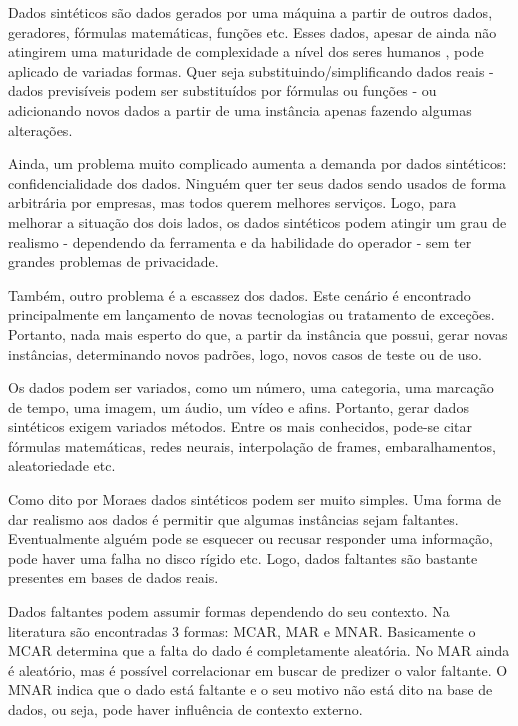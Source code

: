 \documentclass[
	12pt,				%
	openright,			%
	twoside,			%
	a4paper,			%
	english,			%
	brazil				%
	]{abntex2}
\begin{document}
Dados sintéticos são dados gerados por uma máquina \cite{pensamentos-dados-sinteticos} a partir de outros dados, geradores, fórmulas matemáticas, funções etc.
Esses dados, apesar de ainda não atingirem uma maturidade de complexidade a nível dos seres humanos \cite{pensamentos-dados-sinteticos}, pode aplicado de variadas formas.
Quer seja substituindo/simplificando dados reais - dados previsíveis podem ser substituídos por fórmulas ou funções - ou adicionando novos dados a partir de uma instância apenas fazendo algumas alterações.
\par
Ainda, um problema muito complicado aumenta a demanda por dados sintéticos: confidencialidade dos dados.
Ninguém quer ter seus dados sendo usados de forma arbitrária por empresas, mas todos querem melhores serviços.
Logo, para melhorar a situação dos dois lados, os dados sintéticos podem atingir um grau de realismo - dependendo da ferramenta e da habilidade do operador - sem ter grandes problemas de privacidade.
\par
Também, outro problema é a escassez dos dados.
Este cenário é encontrado principalmente em lançamento de novas tecnologias ou tratamento de exceções.
Portanto, nada mais esperto do que, a partir da instância que possui, gerar novas instâncias, determinando novos padrões, logo, novos casos de teste ou de uso.
\par
Os dados podem ser variados, como um número, uma categoria, uma marcação de tempo, uma imagem, um áudio, um vídeo e afins.
Portanto, gerar dados sintéticos exigem variados métodos.
Entre os mais conhecidos, pode-se citar fórmulas matemáticas, redes neurais, interpolação de frames, embaralhamentos, aleatoriedade etc.
\par
Como dito por Moraes \cite{pensamentos-dados-sinteticos} dados sintéticos podem ser muito simples.
Uma forma de dar realismo aos dados é permitir que algumas instâncias sejam faltantes.
Eventualmente alguém pode se esquecer ou recusar responder uma informação, pode haver uma falha no disco rígido etc.
Logo, dados faltantes são bastante presentes em bases de dados reais.
\par
Dados faltantes podem assumir formas dependendo do seu contexto.
Na literatura são encontradas 3 formas: MCAR, MAR e MNAR.
Basicamente o MCAR determina que a falta do dado é completamente aleatória.
No MAR ainda é aleatório, mas é possível correlacionar em buscar de predizer o valor faltante.
O MNAR indica que o dado está faltante e o seu motivo não está dito na base de dados, ou seja, pode haver influência de contexto externo.
\end{document}
